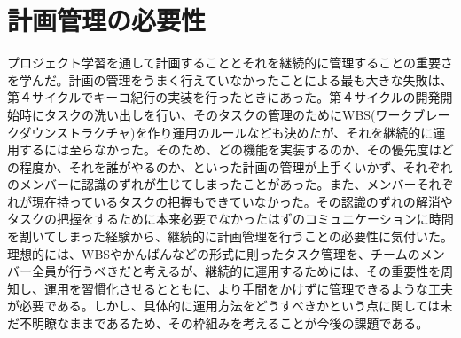 \section{計画管理の必要性}
プロジェクト学習を通して計画することとそれを継続的に管理することの重要さを学んだ。計画の管理をうまく行えていなかったことによる最も大きな失敗は、第４サイクルでキーコ紀行の実装を行ったときにあった。第４サイクルの開発開始時にタスクの洗い出しを行い、そのタスクの管理のためにWBS(ワークブレークダウンストラクチャ)を作り運用のルールなども決めたが、それを継続的に運用するには至らなかった。そのため、どの機能を実装するのか、その優先度はどの程度か、それを誰がやるのか、といった計画の管理が上手くいかず、それぞれのメンバーに認識のずれが生じてしまったことがあった。また、メンバーそれぞれが現在持っているタスクの把握もできていなかった。その認識のずれの解消やタスクの把握をするために本来必要でなかったはずのコミュニケーションに時間を割いてしまった経験から、継続的に計画管理を行うことの必要性に気付いた。理想的には、WBSやかんばんなどの形式に則ったタスク管理を、チームのメンバー全員が行うべきだと考えるが、継続的に運用するためには、その重要性を周知し、運用を習慣化させるとともに、より手間をかけずに管理できるような工夫が必要である。しかし、具体的に運用方法をどうすべきかという点に関しては未だ不明瞭なままであるため、その枠組みを考えることが今後の課題である。
